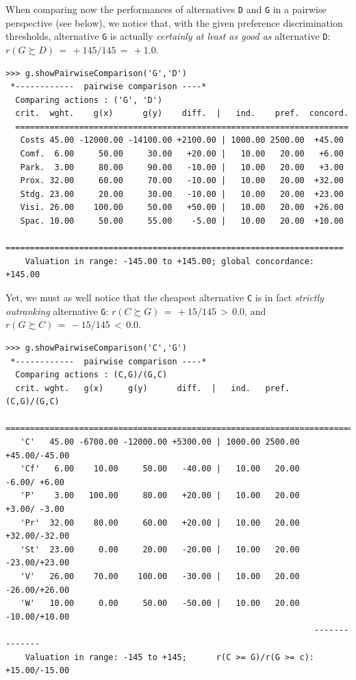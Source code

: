 When comparing now the performances of alternatives \texttt{D} and \texttt{G} in a pairwise perspective (see below), we notice that, with the given preference discrimination thresholds, alternative \texttt{G} is actually \emph{certainly at least as good as} alternative \texttt{D}:  $r(G \succsim D)\, = \, +145/145\, =\, +1.0$.
\begin{lstlisting}[caption={Inspecting pairwise comparisons},label=list:4.5,basicstyle=\ttfamily\scriptsize]
>>> g.showPairwiseComparison('G','D')
 *------------  pairwise comparison ----*
  Comparing actions : ('G', 'D')
  crit.  wght.    g(x)      g(y)    diff.  |   ind.    pref.  concord. 
  ====================================================================
   Costs 45.00 -12000.00 -14100.00 +2100.00 | 1000.00 2500.00  +45.00  
   Comf.  6.00     50.00     30.00   +20.00 |   10.00   20.00   +6.00 
   Park.  3.00     80.00     90.00   -10.00 |   10.00   20.00   +3.00 
   Prox. 32.00     60.00     70.00   -10.00 |   10.00   20.00  +32.00 
   Stdg. 23.00     20.00     30.00   -10.00 |   10.00   20.00  +23.00 
   Visi. 26.00    100.00     50.00   +50.00 |   10.00   20.00  +26.00 
   Spac. 10.00     50.00     55.00    -5.00 |   10.00   20.00  +10.00
   =====================================================================
    Valuation in range: -145.00 to +145.00; global concordance: +145.00
\end{lstlisting}

Yet, we must as well notice that the cheapest alternative \texttt{C} is in fact \emph{strictly outranking} alternative \texttt{G}:  $r(C \succsim G)\, =\, +15/145\, >\, 0.0$, and $r(G \succsim C)\, =\, -15/145 \,<\, 0.0$.
\begin{lstlisting}[basicstyle=\ttfamily\scriptsize]
>>> g.showPairwiseComparison('C','G')
 *------------  pairwise comparison ----*
  Comparing actions : (C,G)/(G,C)
  crit. wght.   g(x)     g(y)      diff.  |   ind.   pref.       (C,G)/(G,C)
   ==========================================================================
   'C'   45.00 -6700.00 -12000.00 +5300.00 | 1000.00 2500.00    +45.00/-45.00 
   'Cf'   6.00    10.00     50.00   -40.00 |   10.00   20.00     -6.00/ +6.00 
   'P'    3.00   100.00     80.00   +20.00 |   10.00   20.00     +3.00/ -3.00 
   'Pr'  32.00    80.00     60.00   +20.00 |   10.00   20.00    +32.00/-32.00 
   'St'  23.00     0.00     20.00   -20.00 |   10.00   20.00    -23.00/+23.00 
   'V'   26.00    70.00    100.00   -30.00 |   10.00   20.00    -26.00/+26.00 
   'W'   10.00     0.00     50.00   -50.00 |   10.00   20.00    -10.00/+10.00
                                                               --------------
    Valuation in range: -145 to +145;      r(C >= G)/r(G >= c): +15.00/-15.00
\end{lstlisting}

